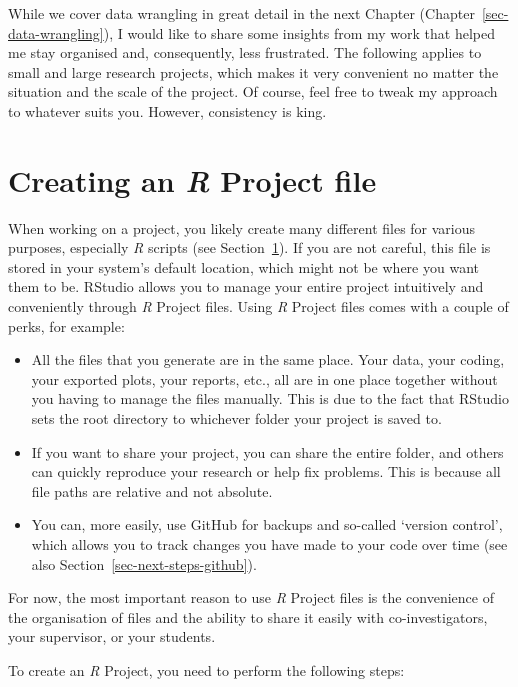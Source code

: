 \documentclass[
  letterpaper,
  DIV=11,
  numbers=noendperiod]{scrreprt}
\begin{document}
While we cover data wrangling in great detail in the next Chapter
(Chapter~\ref{sec-data-wrangling}), I would like to share some insights
from my work that helped me stay organised and, consequently, less
frustrated. The following applies to small and large research projects,
which makes it very convenient no matter the situation and the scale of
the project. Of course, feel free to tweak my approach to whatever suits
you. However, consistency is king.

\section{\texorpdfstring{Creating an \emph{R} Project
file}{Creating an R Project file}}\label{sec-creating-an-r-project}

When working on a project, you likely create many different files for
various purposes, especially \emph{R} scripts (see
Section~\ref{sec-creating-an-r-project}). If you are not careful, this
file is stored in your system's default location, which might not be
where you want them to be. RStudio allows you to manage your entire
project intuitively and conveniently through \emph{R} Project files.
Using \emph{R} Project files comes with a couple of perks, for example:

\begin{itemize}
\item
  All the files that you generate are in the same place. Your data, your
  coding, your exported plots, your reports, etc., all are in one place
  together without you having to manage the files manually. This is due
  to the fact that RStudio sets the root directory to whichever folder
  your project is saved to.
\item
  If you want to share your project, you can share the entire folder,
  and others can quickly reproduce your research or help fix problems.
  This is because all file paths are relative and not absolute.
\item
  You can, more easily, use GitHub for backups and so-called `version
  control', which allows you to track changes you have made to your code
  over time (see also Section~\ref{sec-next-steps-github}).
\end{itemize}

For now, the most important reason to use \emph{R} Project files is the
convenience of the organisation of files and the ability to share it
easily with co-investigators, your supervisor, or your students.

To create an \emph{R} Project, you need to perform the following steps:
\end{document}
